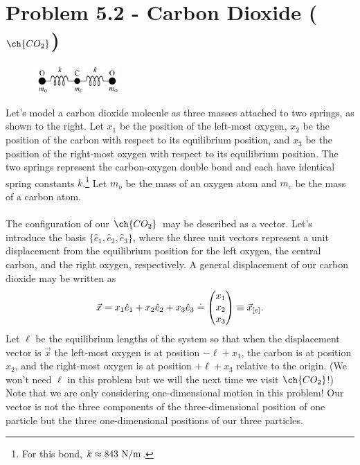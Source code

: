 \documentclass{article}
\def\OCO{$\ch{CO_2}$}
\begin{document}
\section*{Problem 5.2 - Carbon Dioxide (\OCO)}

\paragraph{}
	\setlength{\intextsep}{0pt}%
	\begin{figure}
		\includegraphics[width = 0.3\textwidth]{89-PS5-P2-CO2}
	\end{figure}
Let's model a carbon dioxide molecule as three masses attached to two springs, as shown to the right. 
Let $x_{1}$ be the position of the left-most oxygen, $x_{2}$ be the position of the carbon with respect to its equilibrium position, and $x_{3}$ be the position of the 
right-most oxygen with respect to its equilibrium position.  
The two springs represent the carbon-oxygen double bond and each have identical spring constants $k$.\footnote{For this bond, $k \approx 843\ \units{N}/\units{m}$.}  
Let $m_{o}$ be the mass of an oxygen atom and $m_{c}$ be the mass of a carbon atom.

\paragraph{}
The configuration of our \OCO\ may be described as a vector.  Let's introduce the basis $\{\hat{e}_{1},\hat{e}_{2},\hat{e}_{3}\}$, where
the three unit vectors represent a unit displacement from the equilibrium position for the left oxygen, the central carbon, and the right oxygen, respectively.  
A general displacement of our carbon dioxide may be written as
	\begin{equation*}
		\vec{x} = x_{1}\hat{e}_{1} + x_{2}\hat{e}_{2} + x_{3}\hat{e}_{3}	\doteq	\begin{pmatrix} x_{1}\\ x_{2}\\ x_{3} \end{pmatrix} \equiv \vec{x}_{[e]}.
	\end{equation*}
Let $\ell$ be the equilibrium lengths of the system so that when the displacement vector is $\vec{x}$ the left-most oxygen is at position $-\ell+x_{1}$, the carbon is at 
position $x_{2}$, and the right-most oxygen is at position $+\ell+x_{3}$ relative to the origin.  (We won't need $\ell$ in this problem but we will the next time we
visit \OCO!)
Note that we are only considering one-dimensional motion in this problem!  
Our vector is not the three components of the three-dimensional position of one particle but the three one-dimensional positions of our three particles.
\end{document}
